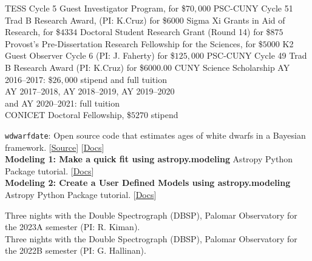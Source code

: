 \documentclass[10pt]{cv}
\newcommand\tab[1][1cm]{\hspace*{#1}}
\begin{document}
\begin{llist}

TESS Cycle 5 Guest Investigator Program, for \$$70,000$
PSC-CUNY Cycle 51 Trad B Research Award, (PI: K.Cruz) for \$$6000$
Sigma Xi Grants in Aid of Research, for \$$4334$
Doctoral Student Research Grant (Round 14) for \$$875$    
Provost’s Pre-Dissertation Research Fellowship for the Sciences, for \$$5000$
K2 Guest Observer Cycle 6 (PI: J. Faherty) for \$$125,000$
PSC-CUNY Cycle 49 Trad B Research Award (PI: K.Cruz) for \$$6000.00$
CUNY Science Scholarship
\tab AY 2016–2017: \$$26,000$ stipend and full tuition\\
\tab AY 2017–2018, AY 2018–2019, AY 2019–2020\\ 
\tab and AY 2020–2021: full tuition\\
CONICET Doctoral Fellowship, \$$5270$ stipend



\texttt{wdwarfdate}: Open source code that estimates ages of white dwarfs in a Bayesian framework. [\href{https://github.com/rkiman/wdwarfdate}{Source}] [\href{https://wdwarfdate.readthedocs.io/en/latest/}{Docs}] \\
\textbf{Modeling 1: Make a quick fit using astropy.modeling}
Astropy Python Package tutorial. [\href{http://learn.astropy.org/rst-tutorials/Models-Quick-Fit.html?highlight=filtertutorials}{Docs}]\\
\textbf{Modeling 2: Create a User Defined Models using astropy.modeling}
Astropy Python Package tutorial. [\href{http://learn.astropy.org/rst-tutorials/User-Defined-Model.html?highlight=filtertutorials}{Docs}] 


Three nights with the Double Spectrograph (DBSP), Palomar Observatory for the 2023A semester (PI: R. Kiman).\\
Three nights with the Double Spectrograph (DBSP), Palomar Observatory for the 2022B semester (PI: G. Hallinan).




\end{llist}
\end{document}
